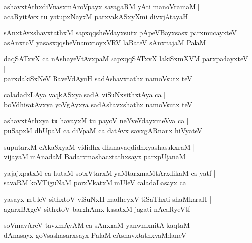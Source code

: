 \documentclass[twoside,12pt,openright]{book}
\newcounter{shloka}[chapter]
\begin{document}
\begin{shloka}%
ashavxtAthxdiVnasxmAroVpayx savagaRM yAti manoVramaM |\\
acaRyitAvx tu yatupxNayxM parxvakASxyXmi divxjAtayaH 
\end{shloka}

\begin{shloka}%
sAnxtAvxshavxtathxM sapxqqsheVdayxsutx pApeVBayxsasx parxmucayxteV |\\
asAnxtoV yasasxqqsheVnamxtoyxVRV laBateV sAnxnajaM PalaM
\end{shloka}

\begin{shloka}%
daqSATxvX ca nAshayeVtAvxpaM sapxqqSATxvX lakiSxmXVM parxpadayxteV |\\
parxdakiSxNeV BaveVdAyuH sadAshavxtathx namoVsutx teV
\end{shloka}

\begin{shloka}%
caladadxLAya vaqkASxya sadA viSuNxsithxtAya ca |\\
boVdhisatAvxya yoVgAyxya sadAshavxshathx namoVsutx teV 
\end{shloka}

\begin{shloka}%
ashavxtAthxya tu havayxM tu payoV neYveVdayxmeVva ca |\\
puSapxM dhUpaM ca diVpaM ca datAvx savxgARnanx hiVyateV 
\end{shloka}

\begin{shloka}%
suputarxM cAkaSxyaM vididhx dhanavaqdidhxyashasakxraM |\\
vijayaM mAnadaM Badarxmashacxtathxsayx parxpUjanaM 
\end{shloka}

\begin{shloka}%
yajajxpatxM ca hutaM sotxVtarxM yaMtarxmaMtArxdikaM ca yatf |\\
savaRM koVTiguNaM porxVkatxM mUleV caladaLasayx ca 
\end{shloka}

\begin{shloka}%
yasayx mUleV sithxtoV viSuNxH madheyxV tiSaThxti shaMkaraH |\\
agarxBAgeV sithxtoV barxhAmx kasatxM jagati nAcaRyeVtf
\end{shloka}

\begin{shloka}%
soVmavAreV tavxmAyAM ca sAnxnaM yanwmxnitA kaqtaM |\\
dAnasayx goVsashasarxsayx PalaM cAshavxtathxvaMdaneV
\end{shloka}
\end{document}
